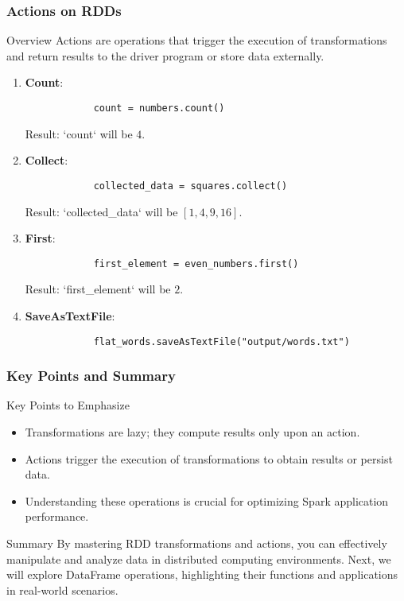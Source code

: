 \documentclass[aspectratio=169]{beamer}
\begin{document}
\begin{frame}[fragile]
    \frametitle{Actions on RDDs}
    
    \begin{block}{Overview}
        Actions are operations that trigger the execution of transformations and return results to the driver program or store data externally.
    \end{block}

    \begin{enumerate}
        \item \textbf{Count}:
            \begin{lstlisting}
            count = numbers.count()
            \end{lstlisting}
            Result: `count` will be \(4\).

        \item \textbf{Collect}:
            \begin{lstlisting}
            collected_data = squares.collect()
            \end{lstlisting}
            Result: `collected_data` will be \([1, 4, 9, 16]\).

        \item \textbf{First}:
            \begin{lstlisting}
            first_element = even_numbers.first()
            \end{lstlisting}
            Result: `first_element` will be \(2\).

        \item \textbf{SaveAsTextFile}:
            \begin{lstlisting}
            flat_words.saveAsTextFile("output/words.txt")
            \end{lstlisting}
    \end{enumerate}
\end{frame}

\begin{frame}[fragile]
    \frametitle{Key Points and Summary}
    \begin{block}{Key Points to Emphasize}
        \begin{itemize}
            \item Transformations are lazy; they compute results only upon an action.
            \item Actions trigger the execution of transformations to obtain results or persist data.
            \item Understanding these operations is crucial for optimizing Spark application performance.
        \end{itemize}
    \end{block}

    \begin{block}{Summary}
        By mastering RDD transformations and actions, you can effectively manipulate and analyze data in distributed computing environments.
        Next, we will explore DataFrame operations, highlighting their functions and applications in real-world scenarios.
    \end{block}
\end{frame}
\end{document}
